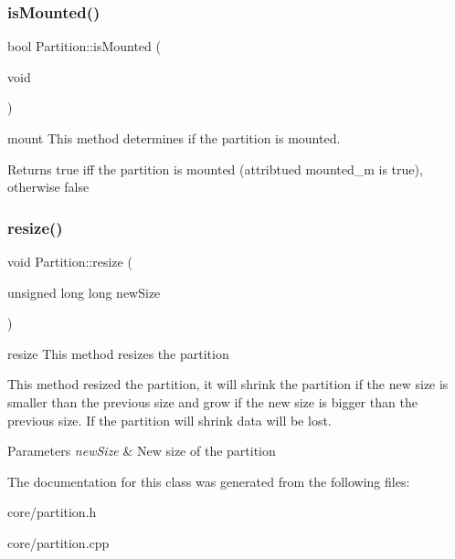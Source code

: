 \subsubsection{\texorpdfstring{is\+Mounted()}{isMounted()}}
{\footnotesize\ttfamily bool Partition\+::is\+Mounted (\begin{DoxyParamCaption}\item[{void}]{ }\end{DoxyParamCaption})}



mount This method determines if the partition is mounted. 

\begin{DoxyReturn}{Returns}
true iff the partition is mounted (attribtued mounted\+\_\+m is true), otherwise false 
\end{DoxyReturn}
\mbox{\label{classlogic_1_1_partition_ab7b1a0f3847b9117a284cf4022e05e88}} 
\subsubsection{\texorpdfstring{resize()}{resize()}}
{\footnotesize\ttfamily void Partition\+::resize (\begin{DoxyParamCaption}\item[{unsigned long long}]{new\+Size }\end{DoxyParamCaption})}



resize This method resizes the partition 

This method resized the partition, it will shrink the partition if the new size is smaller than the previous size and grow if the new size is bigger than the previous size. If the partition will shrink data will be lost. 
\begin{DoxyParams}{Parameters}
{\em new\+Size} & New size of the partition \\
\hline
\end{DoxyParams}


The documentation for this class was generated from the following files\+:\begin{DoxyCompactItemize}
\item 
core/partition.\+h\item 
core/partition.\+cpp\end{DoxyCompactItemize}

